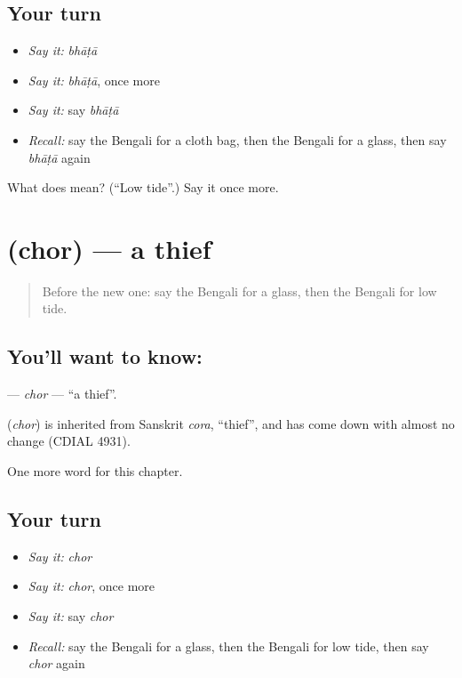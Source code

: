 \subsection*{Your turn}
\begin{itemize}
\raggedright
  \item \emph{Say it:} \emph{bhāṭā}
  \item \emph{Say it:} \emph{bhāṭā}, once more
  \item \emph{Say it:} say \emph{bhāṭā}
  \item \emph{Recall:} say the Bengali for a cloth bag, then the Bengali for a glass, then say \emph{bhāṭā} again
\end{itemize}

\begin{tcolorbox}[breakable,colback=teal!4,colframe=teal!35!black,title={Before you move on}]
What does  mean? (\textquotedblleft{}Low tide\textquotedblright{}.) Say it once more.
\end{tcolorbox}
\section[\texorpdfstring{\bn{চোর} (chor)}{চোর (chor)}]{ (chor) — a thief}

\label{lesson:BN-C202-chor}



\begin{quote}
Before the new one: say the Bengali for a glass, then the Bengali for low tide.
\end{quote}

\subsection*{You'll want to know: }
\textbf{} — \emph{chor} — \textquotedblleft{}a thief\textquotedblright{}.

\begin{cousinweb}
\textbf{} (\emph{chor}) is inherited from Sanskrit \emph{cora}, \textquotedblleft{}thief\textquotedblright{}, and has come down with almost no change (CDIAL 4931).
\end{cousinweb}

\begin{grammarlens}[title={What you've built}]
One more word for this chapter.
\end{grammarlens}

\subsection*{Your turn}
\begin{itemize}
\raggedright
  \item \emph{Say it:} \emph{chor}
  \item \emph{Say it:} \emph{chor}, once more
  \item \emph{Say it:} say \emph{chor}
  \item \emph{Recall:} say the Bengali for a glass, then the Bengali for low tide, then say \emph{chor} again
\end{itemize}

